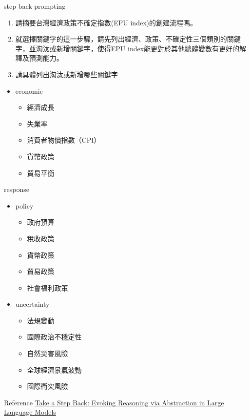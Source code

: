 \documentclass[12pt]{beamer}
\begin{document}
\begin{frame}{step back prompting}
    \begin{enumerate}
        \item 請摘要台灣經濟政策不確定指數(EPU index)的創建流程嗎。
        \item 就選擇關鍵字的這一步驟，請先列出經濟、政策、不確定性三個類別的關鍵字，並淘汰或新增關鍵字，使得EPU index能更對於其他總體變數有更好的解釋及預測能力。
        \item 請具體列出淘汰或新增哪些關鍵字
    \end{enumerate}

    \begin{itemize}
        \item economic
        \begin{itemize}
            \item 經濟成長
            \item 失業率
            \item 消費者物價指數（CPI）
            \item 貨幣政策
            \item 貿易平衡
        \end{itemize}
    \end{itemize}
\end{frame}

\begin{frame}{response}
    \begin{itemize}
        \item policy
        \begin{itemize}
            \item 政府預算
            \item 稅收政策
            \item 貨幣政策
            \item 貿易政策
            \item 社會福利政策
        \end{itemize}
        \item uncertainty
        \begin{itemize}
            \item 法規變動
            \item 國際政治不穩定性
            \item 自然災害風險
            \item 全球經濟景氣波動
            \item 國際衝突風險
        \end{itemize}
    \end{itemize}
\end{frame}


\begin{frame}{Reference}
    \href{https://arxiv.org/abs/2310.06117}{Take a Step Back: Evoking Reasoning via Abstraction in Large Language Models}
\end{frame}
\end{document}
